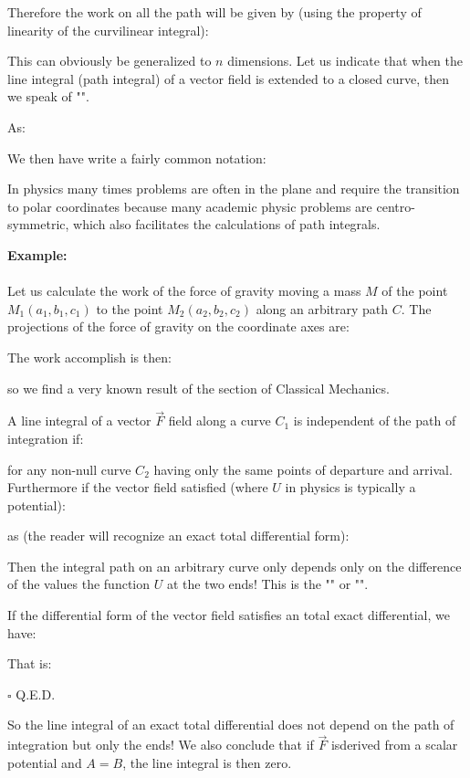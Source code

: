 	Therefore the work on all the path will be given by (using the property of linearity of the curvilinear integral):
	
	This can obviously be generalized to $n$ dimensions. Let us indicate that when the line integral (path integral) of a vector field is extended to a closed curve, then we speak of "".
	
	As:
	
	We then have write a fairly common notation:
	
	\begin{tcolorbox}[title=Remark,colframe=black,arc=10pt]
	In physics many times problems are often in the plane and require the transition to polar coordinates because many academic physic problems are centro-symmetric, which also facilitates the calculations of path integrals.
	\end{tcolorbox}
	
	\begin{tcolorbox}[colframe=black,colback=white,sharp corners]
	\textbf{{\Large {}}Example:}\\\\
	Let us calculate the work of the force of gravity moving a mass $M$ of the point $M_1(a_1,b_1,c_1)$ to the point $M_2(a_2,b_2,c_2)$ along an arbitrary path $C$. The projections of the force of gravity on the coordinate axes are:
	
	The work accomplish is then:
	
	so we find a very known result of the section of Classical Mechanics.
	\end{tcolorbox}
	A line integral of a vector $\vec{F}$ field along a curve $C_1$ is independent of the path of integration if:
	
	for any non-null curve $C_2$ having only the same points of departure and arrival. Furthermore if the vector field satisfied (where $U$ in physics is typically a potential):
	
	as (the reader will recognize an exact total differential form):
	
	Then the integral path on an arbitrary curve only depends only on the difference of the values the function $U$ at the two ends! This is the "" or "".
	\begin{dem}
	If the differential form of the vector field satisfies an total exact differential, we have:
	
	That is:
	
	\begin{flushright}
		$\square$  Q.E.D.
	\end{flushright}
	\end{dem}
	So the line integral of an exact total differential does not depend on the path of integration but only the ends! We also conclude that if $\vec{F}$ isderived from a scalar potential and $A = B$, the line integral is then zero.
	
